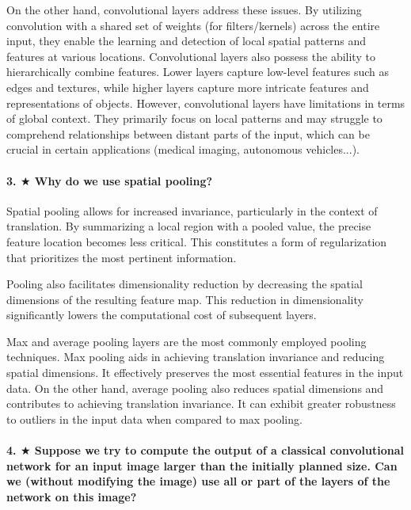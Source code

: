 On the other hand, convolutional layers address these issues. By utilizing convolution with a shared set of weights (for filters/kernels) across the entire input, they enable the learning and detection of local spatial patterns and features at various locations. Convolutional layers also possess the ability to hierarchically combine features. Lower layers capture low-level features such as edges and textures, while higher layers capture more intricate features and representations of objects. However, convolutional layers have limitations in terms of global context. They primarily focus on local patterns and may struggle to comprehend relationships between distant parts of the input, which can be crucial in certain applications (medical imaging, autonomous vehicles...).

\paragraph{3. $ \bigstar $ Why do we use spatial pooling?}
Spatial pooling allows for increased invariance, particularly in the context of translation. By summarizing a local region with a pooled value, the precise feature location becomes less critical. This constitutes a form of regularization that prioritizes the most pertinent information.

Pooling also facilitates dimensionality reduction by decreasing the spatial dimensions of the resulting feature map. This reduction in dimensionality significantly lowers the computational cost of subsequent layers.

Max and average pooling layers are the most commonly employed pooling techniques. Max pooling aids in achieving translation invariance and reducing spatial dimensions. It effectively preserves the most essential features in the input data. On the other hand, average pooling also reduces spatial dimensions and contributes to achieving translation invariance. It can exhibit greater robustness to outliers in the input data when compared to max pooling.

\paragraph{4. $ \bigstar $ Suppose we try to compute the output of a classical convolutional network for an input image larger than the initially planned size. Can we (without modifying the image) use all or part of the layers of the network on this image?}

